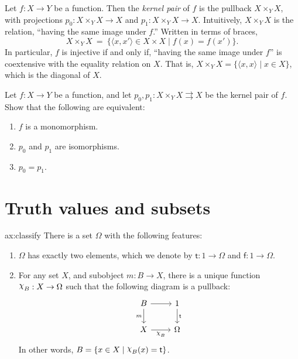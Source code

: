 \begin{defn} Let $f:X\to Y$ be a function.  Then the \emph{kernel
    pair} of $f$ is the pullback $X\times _YX$, with projections
  $p_0:X\times _YX\to X$ and $p_1:X\times _YX\to X$.  Intuitively,
  $X\times _YX$ is the relation, ``having the same image under $f$.''
  Written in terms of braces, 
  \[ X\times _YX \: = \: \{ \langle x,x'\rangle \in X\times X \mid
  f(x)=f(x') \} .\] In particular, $f$ is injective if and only if,
  ``having the same image under $f$'' is coextensive with the equality
  relation on $X$.  That is, $X\times _YX=\{ \langle x,x\rangle \mid
  x\in X \}$, which is the diagonal of $X$. \end{defn}

\begin{exercise} Let $f:X\to Y$ be a function, and let
  $p_0,p_1:X\times _YX\rightrightarrows X$ be the kernel pair of $f$.
  Show that the following are equivalent:
\begin{enumerate}
\item $f$ is a monomorphism.
\item $p_0$ and $p_1$ are isomorphisms.
\item $p_0=p_1$.  \end{enumerate} \label{kkp} \end{exercise}



\section{Truth values and subsets}

\newcommand{\true}{\mathsf{t}} \newcommand{\false}{\mathsf{f}}

\newcommand{\tr}{\mathsf{t}} \newcommand{\f}{\mathsf{f}}

\begin{axi}{ax:classify} There is a set $\Omega$
  with the following features:
\begin{enumerate}
\item $\Omega$ has exactly two elements, which we denote by $\true
  :1\to \Omega$ and $\false :1\to \Omega$.
\item For any set $X$, and subobject $m:B\to X$, there is a unique
  function $\ch{B}:X\to \Omega$ such that the following diagram is a
  pullback:
  \[ \begin{tikzcd}
    B \arrow[d, "m"'] \arrow{r} & 1 \arrow{d}{\true} \\
    X \arrow[r, "\ch{B}"'] & \Omega \end{tikzcd} \] In other words,
  $B=\{ x\in X\mid \ch{B}(x)=\tr \}$.
\end{enumerate} \label{ax:classify}
\end{axi}

